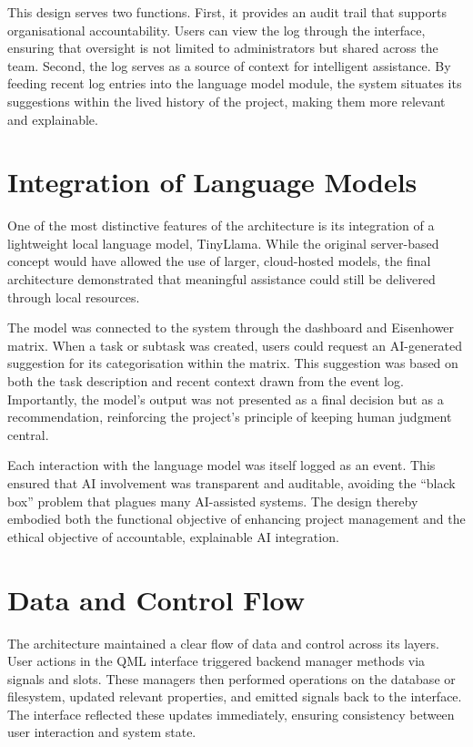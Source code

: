 \documentclass{report}
\begin{document}
This design serves two functions. First, it provides an audit trail that supports organisational accountability. Users can view the log through the interface, ensuring that oversight is not limited to administrators but shared across the team. Second, the log serves as a source of context for intelligent assistance. By feeding recent log entries into the language model module, the system situates its suggestions within the lived history of the project, making them more relevant and explainable.

\section{Integration of Language Models}

One of the most distinctive features of the architecture is its integration of a lightweight local language model, TinyLlama. While the original server-based concept would have allowed the use of larger, cloud-hosted models, the final architecture demonstrated that meaningful assistance could still be delivered through local resources.

The model was connected to the system through the dashboard and Eisenhower matrix. When a task or subtask was created, users could request an AI-generated suggestion for its categorisation within the matrix. This suggestion was based on both the task description and recent context drawn from the event log. Importantly, the model’s output was not presented as a final decision but as a recommendation, reinforcing the project’s principle of keeping human judgment central.

Each interaction with the language model was itself logged as an event. This ensured that AI involvement was transparent and auditable, avoiding the “black box” problem that plagues many AI-assisted systems. The design thereby embodied both the functional objective of enhancing project management and the ethical objective of accountable, explainable AI integration.

\section{Data and Control Flow}

The architecture maintained a clear flow of data and control across its layers. User actions in the QML interface triggered backend manager methods via signals and slots. These managers then performed operations on the database or filesystem, updated relevant properties, and emitted signals back to the interface. The interface reflected these updates immediately, ensuring consistency between user interaction and system state.
\end{document}
